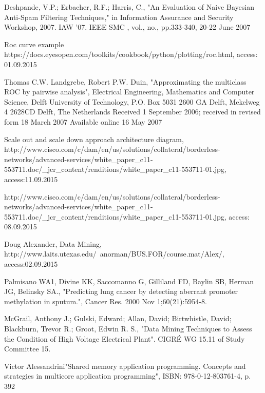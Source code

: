 \begin{thebibliography}{99}
Deshpande, V.P.; Erbacher, R.F.; Harris, C., "An Evaluation of Naive Bayesian Anti-Spam Filtering Techniques," in Information Assurance and Security Workshop, 2007. IAW '07. IEEE SMC , vol., no., pp.333-340, 20-22 June 2007

Roc curve example https://docs.eyesopen.com/toolkits/cookbook/python/plotting/roc.html, access: 01.09.2015

Thomas C.W. Landgrebe, Robert P.W. Duin, "Approximating the multiclass ROC by pairwise analysis", Electrical Engineering, Mathematics and Computer Science, Delft University of Technology, P.O. Box 5031 2600 GA Delft,
Mekelweg 4 2628CD Delft, The Netherlands
Received 1 September 2006; received in revised form 18 March 2007
Available online 16 May 2007

Scale out and scale down approach architecture diagram, http://www.cisco.com/c/dam/en/us/solutions/collateral/borderless-networks/advanced-services/white\_paper\_c11-553711.doc/\_jcr\_content/renditions/white\_paper\_c11-553711-01.jpg, access:11.09.2015

http://www.cisco.com/c/dam/en/us/solutions/collateral/borderless-networks/advanced-services/white\_paper\_c11-553711.doc/\_jcr\_content/renditions/white\_paper\_c11-553711-01.jpg, access: 08.09.2015

Doug Alexander, Data Mining, http://www.laits.utexas.edu/~anorman/BUS.FOR/course.mat/Alex/, access:02.09.2015

Palmisano WA1, Divine KK, Saccomanno G, Gilliland FD, Baylin SB, Herman JG, Belinsky SA., "Predicting lung cancer by detecting aberrant promoter methylation in sputum.", Cancer Res. 2000 Nov 1;60(21):5954-8.

McGrail, Anthony J.; Gulski, Edward; Allan, David; Birtwhistle, David; Blackburn, Trevor R.; Groot, Edwin R. S., "Data Mining Techniques to Assess the Condition of High Voltage Electrical Plant". CIGRÉ WG 15.11 of Study Committee 15.

Victor Alessandrini"Shared memory application programming. Concepts and strategies in multicore application programming", ISBN: 978-0-12-803761-4, p. 392



\end{thebibliography}
